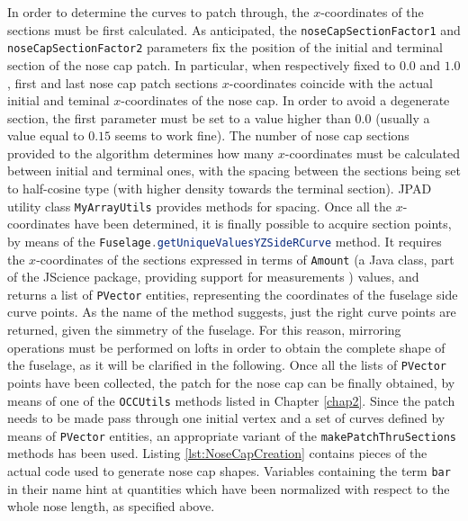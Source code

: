 \bigskip
\noindent
In order to determine the curves to patch through, the $x$-coordinates of the sections must be first calculated. As anticipated, the \lstinline[language=Java]!noseCapSectionFactor1! and \lstinline[language=Java]!noseCapSectionFactor2! parameters fix the position of the initial and terminal section of the nose cap patch. In particular, when respectively fixed to $0.0$ and $1.0$, first and last nose cap patch sections $x$-coordinates coincide with the actual initial and teminal $x$-coordinates of the nose cap. In order to avoid a degenerate section, the first parameter must be set to a value higher than $0.0$ (usually a value equal to $0.15$ seems to work fine). The number of nose cap sections provided to the algorithm determines how many $x$-coordinates must be calculated between initial and terminal ones, with the spacing between the sections being set to half-cosine type (with higher density towards the terminal section). \gls{JPAD} utility class \lstinline[language=Java]!MyArrayUtils! provides methods for spacing. Once all the $x$-coordinates have been determined, it is finally possible to acquire section points, by means of the \lstinline[language=Java]!Fuselage.getUniqueValuesYZSideRCurve! method. It requires the $x$-coordinates of the sections expressed in terms of \lstinline[language=Java]!Amount! (a Java class, part of the JScience package, providing support for measurements \cite{Amount}) values, and returns a list of \lstinline[language=Java]!PVector! entities, representing the coordinates of the fuselage side curve points. As the name of the method suggests, just the right curve points are returned, given the simmetry of the fuselage. For this reason, mirroring operations must be performed on lofts in order to obtain the complete shape of the fuselage, as it will be clarified in the following. Once all the lists of \lstinline[language=Java]!PVector! points have been collected, the patch for the nose cap can be finally obtained, by means of one of the \lstinline[language=Java]!OCCUtils! methods listed in Chapter \ref{chap2}. Since the patch needs to be made pass through one initial vertex and a set of curves defined by means of \lstinline[language=Java]!PVector! entities, an appropriate variant of the \lstinline[language=Java]!makePatchThruSections! methods has been used. Listing \ref{lst:NoseCapCreation} contains pieces of the actual code used to generate nose cap shapes. Variables containing the term \lstinline[language=Java]!bar! in their name hint at quantities which have been normalized with respect to the whole nose length, as specified above. 
